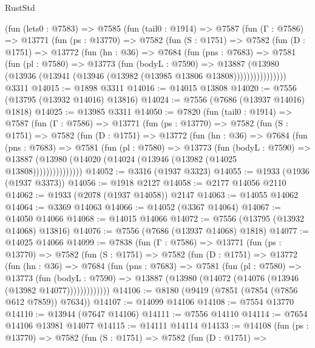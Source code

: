 \begin{lexlean}{RustStd}
\begin{coremodule}
{\begin{coremodule}
{{{{{{{{{{{{{{{{{{{{{{{{{{{{{{{{{{{{{{{{{{{    (fun (lets0 : @7583) =>
    @7585
      (fun (tail0 : @1914) =>
      @7587
        (fun (Γ : @7586) =>
        @13771
          (fun (ps : @13770) =>
          @7582
            (fun (S : @1751) =>
            @7582
              (fun (D : @1751) =>
              @13772
                (fun (hn : @36) =>
                @7684
                  (fun (pns : @7683) =>
                  @7581
                    (fun (pl : @7580) =>
                    @13773
                      (fun (bodyL : @7590) =>
                      @13887
                        (@13980
                          (@13936 (@13941 (@13946 (@13982 (@13985 @13806 @13808))))))))))))))))
    @3311
@14015 := @1898 @3311
@14016 := @14015 @13808
@14020 := @7556 (@13795 (@13932 @14016) @13816)
@14024 := @7556 (@7686 (@13937 @14016) @1818)
@14025 := @13985 @3311
@14050 := @7820
    (fun (tail0 : @1914) =>
    @7587
      (fun (Γ : @7586) =>
      @13771
        (fun (ps : @13770) =>
        @7582
          (fun (S : @1751) =>
          @7582
            (fun (D : @1751) =>
            @13772
              (fun (hn : @36) =>
              @7684
                (fun (pns : @7683) =>
                @7581
                  (fun (pl : @7580) =>
                  @13773
                    (fun (bodyL : @7590) =>
                    @13887 (@13980 (@14020 (@14024 (@13946 (@13982 (@14025 @13808)))))))))))))))
@14052 := @3316 (@1937 @3323)
@14055 := @1933 (@1936 (@1937 @3373))
@14056 := @1918 @2127
@14058 := @2177 @14056 @2110
@14062 := @1933 (@2078 (@1937 @14058)) @2147
@14063 := @14055 @14062
@14064 := @3369 @14063
@14066 := @14052 (@3367 @14064)
@14067 := @14050 @14066
@14068 := @14015 @14066
@14072 := @7556 (@13795 (@13932 @14068) @13816)
@14076 := @7556 (@7686 (@13937 @14068) @1818)
@14077 := @14025 @14066
@14099 := @7838
    (fun (Γ : @7586) =>
    @13771
      (fun (ps : @13770) =>
      @7582
        (fun (S : @1751) =>
        @7582
          (fun (D : @1751) =>
          @13772
            (fun (hn : @36) =>
            @7684
              (fun (pns : @7683) =>
              @7581
                (fun (pl : @7580) =>
                @13773
                  (fun (bodyL : @7590) =>
                  @13887 (@13980 (@14072 (@14076 (@13946 (@13982 @14077)))))))))))))
@14106 := @8180 (@9419 (@7851 (@7854 (@7856 @612 @7859)) @7634))
@14107 := @14099 @14106
@14108 := @7554 @13770
@14110 := @13944 (@7647 @14106)
@14111 := @7556 @14110
@14114 := @7654 @14106 @13981 @14077
@14115 := @14111 @14114
@14133 := @14108
    (fun (ps : @13770) =>
    @7582
      (fun (S : @1751) =>
      @7582
        (fun (D : @1751) =>
}}}}}}}}}}}}}}}}}}}}}}}}}}}}}}}}}}}}}}}}}}}
\end{coremodule}}
\end{coremodule}
\end{lexlean}
